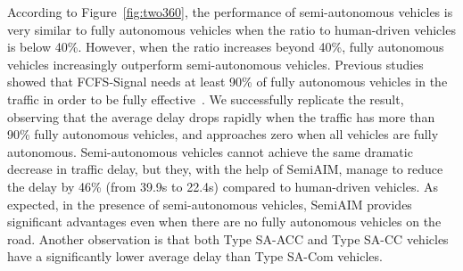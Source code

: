 According to Figure~\ref{fig:two360}, the performance of
semi-autonomous vehicles is very similar to fully autonomous vehicles
when the ratio to human-driven vehicles is below 40\%.  However, when
the ratio increases beyond 40\%, fully autonomous vehicles
increasingly outperform semi-autonomous vehicles.  Previous studies
showed that FCFS-Signal needs at least 90\% of fully autonomous
vehicles in the traffic in order to be fully
effective~\cite{mybib:Dresner07Sharing}.  We successfully replicate the
result, observing that the average delay drops rapidly when the
traffic has more than 90\% fully autonomous vehicles, and approaches
zero when all vehicles are fully autonomous.  Semi-autonomous vehicles
cannot achieve the same dramatic decrease in traffic delay, but they,
with the help of SemiAIM, manage to reduce the delay by 46\% (from
39.9s to 22.4s) compared to human-driven vehicles.  As expected, in
the presence of semi-autonomous vehicles, SemiAIM provides significant
advantages even when there are no fully autonomous vehicles on the
road.
Another observation is that both Type SA-ACC and Type SA-CC vehicles
have a significantly lower average delay than Type SA-Com vehicles.

